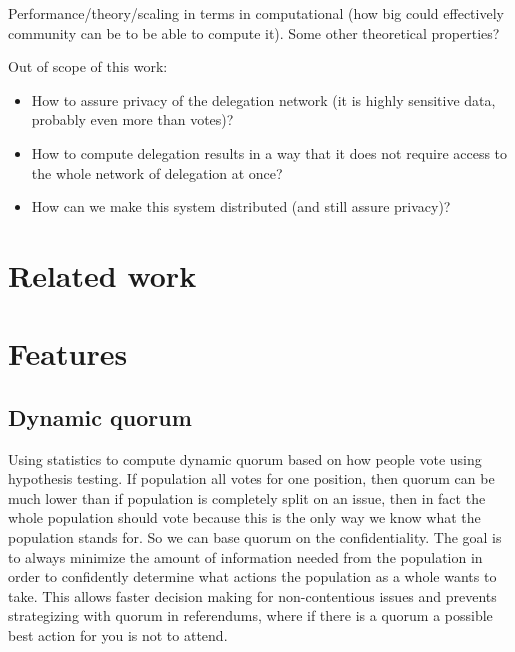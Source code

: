 \documentclass{sigchi}
\begin{document}
Performance/theory/scaling in terms in computational (how big could effectively community can be to be able to compute it).
Some other theoretical properties?

Out of scope of this work:

\begin{itemize}
\item How to assure privacy of the delegation network (it is highly sensitive data, probably even more than votes)?
\item How to compute delegation results in a way that it does not require access to the whole network of delegation at once?
\item How can we make this system distributed (and still assure privacy)?
\end{itemize}

\section{Related work}

\cite{andersen2008trust, dirnstorfer2010voting, ford2002delegative, rodriguez2007smartocracy, yamakawa2007toward}

\section{Features}

\subsection{Dynamic quorum}

Using statistics to compute dynamic quorum based on how people vote using hypothesis testing.
If population all votes for one position, then quorum can be much lower than if population is completely split on an
issue, then in fact the whole population should vote because this is the only way we know what the population stands for.
So we can base quorum on the confidentiality.
The goal is to always minimize the amount of information needed from
the population in order to confidently determine what actions the population as a whole wants to take.
This allows faster decision making for non-contentious issues and prevents strategizing with quorum in
referendums, where if there is a quorum a possible best action for you is not to attend.

\end{document}
